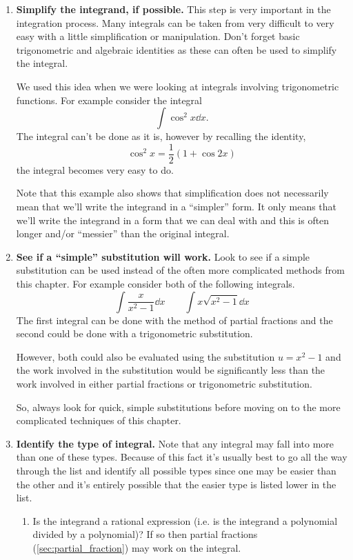 \begin{enumerate}
\item \textbf{Simplify the integrand, if possible.} This step is very important in the integration process. Many integrals can be taken from very difficult to very easy with a little simplification or manipulation. Don't forget basic trigonometric and algebraic identities as these can often be used to simplify the integral.

We used this idea when we were looking at integrals involving trigonometric functions. For example consider the integral
\[\int \cos^2 x\dd x.\]
The integral can't be done as it is, however by recalling the identity,
\[\cos^2 x = \frac{1}{2}(1 + \cos 2x)\]
the integral becomes very easy to do.

Note that this example also shows that simplification does not necessarily mean that we'll write the integrand in a ``simpler'' form. It only means that we'll write the integrand in a form that we can deal with and this is often longer and/or ``messier'' than the original integral.

\item \textbf{See if a ``simple'' substitution will work.} Look to see if a simple substitution can be used instead of the often more complicated methods from this chapter. For example consider both of the following integrals.
\[\int \frac{x}{x^2-1}\dd x \qquad \int x\sqrt{x^2 -1}\dd x\]
The first integral can be done with the method of partial fractions and the second could be done with a trigonometric substitution.

However, both could also be evaluated using the substitution $u=x^2 -1$ and the work involved in the substitution would be significantly less than the work involved in either partial fractions or trigonometric substitution.

So, always look for quick, simple substitutions before moving on to the more complicated techniques of this chapter.

\item \textbf{Identify the type of integral.} Note that any integral may fall into more than 
one of these types. Because of this fact it's usually best to go all the way through the list and identify all possible types since one may be easier than the other and it's entirely possible that the easier type is listed lower in the list.

\begin{enumerate}
\item Is the integrand a rational expression (i.e. is the integrand a polynomial divided by a polynomial)? If so then partial fractions (\autoref{sec:partial_fraction}) may work on the integral.


\end{enumerate}
\end{enumerate}
